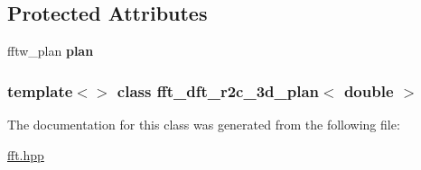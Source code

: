 \subsection*{Protected Attributes}
\begin{DoxyCompactItemize}
\item 
\hypertarget{classfft__dft__r2c__3d__plan_3_01double_01_4_a71d0a9c9d95023e8c617ea74d6a1d2b0}{
fftw\_\-plan {\bfseries plan}}
\label{classfft__dft__r2c__3d__plan_3_01double_01_4_a71d0a9c9d95023e8c617ea74d6a1d2b0}

\end{DoxyCompactItemize}
\subsubsection*{template$<$$>$ class fft\_\-dft\_\-r2c\_\-3d\_\-plan$<$ double $>$}



The documentation for this class was generated from the following file:\begin{DoxyCompactItemize}
\item 
\hyperlink{fft_8hpp}{fft.hpp}\end{DoxyCompactItemize}
